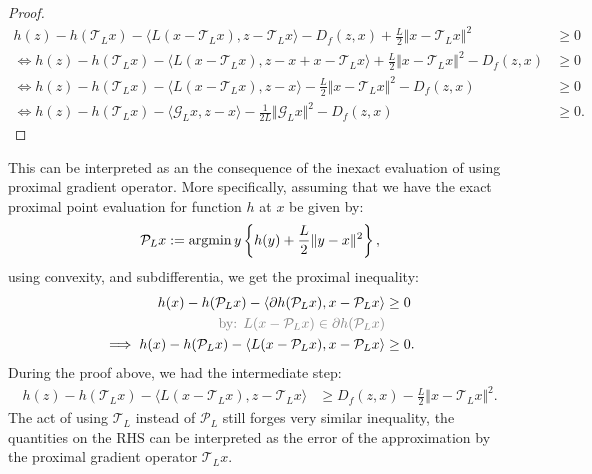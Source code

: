 \documentclass[12pt]{article}
\begin{document}
\begin{proof}
        \begin{align*}
            h(z) - h(\mathcal T_L x)
            - \langle L(x - \mathcal T_L x) , z - \mathcal T_L x\rangle
            - D_f(z, x)
            + \frac{L}{2}\Vert x - \mathcal T_L x\Vert^2
            &\ge 0
            \\
            \iff 
            h(z) - h (\mathcal T_L x)
            - \langle L(x - \mathcal T_L x), z - x + x - \mathcal T_L x\rangle
            + \frac{L}{2}\Vert x - \mathcal T_L x\Vert^2
            - D_f(z, x)
            &\ge 0
            \\
            \iff 
            h(z) - h (\mathcal T_L x)
            - \langle L(x - \mathcal T_L x), z - x\rangle
            - \frac{L}{2}\Vert x - \mathcal T_L x\Vert^2
            - D_f(z, x)
            &\ge 0
            \\
            \iff 
            h(z) - h (\mathcal T_L x)
            - \langle \mathcal G_L x, z - x\rangle
            - \frac{1}{2L}\Vert \mathcal G_L x\Vert^2
            - D_f(z, x)
            &\ge 0. 
        \end{align*}
    \end{proof}
    \begin{observation}
        This can be interpreted as an the consequence of the inexact evaluation of using proximal gradient operator. 
        More specifically, assuming that we have the exact proximal point evaluation for function $h$ at $x$ be given by: 
        \begin{align*}
            \mathcal P_L x := \mathop{\rm argmin}\limits{y}\left\lbrace
                h(y) + \frac{L}{2}\Vert  y- x\Vert^2
            \right\rbrace, 
        \end{align*}
        using convexity, and subdifferentia, we get the proximal inequality: 
        \begin{align*}
            h(x) - h(\mathcal P_Lx) 
            - \langle \partial h(\mathcal P_L x), x - \mathcal P_L x\rangle
            &\ge 
            0
            \\
            \textcolor{gray}{
                \text{by: }
                L(x - \mathcal P_L x) \in \partial h(\mathcal P_L x)
            }&
            \\
            \implies 
            h(x) - h(\mathcal P_Lx) 
            - \langle L(x - \mathcal P_L x), x - \mathcal P_L x\rangle
            &\ge 0. 
        \end{align*}
        During the proof above, we had the intermediate step: 
        \begin{align*}
            h(z) - h(\mathcal T_L x) 
            - \langle
                L(x - \mathcal T_L x), 
                z - \mathcal T_L x
            \rangle 
            &\ge 
            D_f(z, x) - \frac{L}{2}\Vert x - \mathcal T_L x\Vert^2. 
        \end{align*}
        The act of using $\mathcal T_L$ instead of $\mathcal P_L$ still forges very similar inequality, the quantities on the RHS can be interpreted as the error of the approximation by the proximal gradient operator $\mathcal T_L x$. 
    \end{observation}
\end{document}
